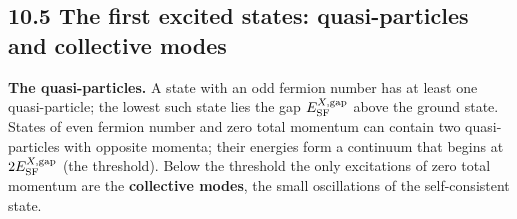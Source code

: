 \documentclass[
  10pt,
]{article}
\begin{document}
\hypertarget{the-first-excited-states-quasi-particles-and-collective-modes}{%
\subsection{10.5 The first excited states: quasi-particles and
collective
modes}\label{the-first-excited-states-quasi-particles-and-collective-modes}}

\textbf{The quasi-particles.} A state with an odd fermion number has at
least one quasi-particle; the lowest such state lies the gap
\(E^{X,{\rm gap}}_{\rm SF}\) above the ground state. States of even
fermion number and zero total momentum can contain two quasi-particles
with opposite momenta; their energies form a continuum that begins at
\(2E^{X,{\rm gap}}_{\rm SF}\) (the threshold). Below the threshold the
only excitations of zero total momentum are the \textbf{collective
modes}, the small oscillations of the self-consistent state.
\end{document}
